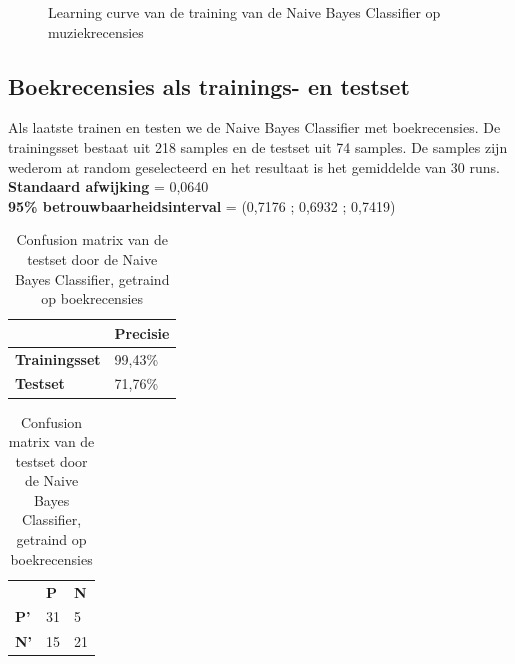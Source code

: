 \begin{appendices}
\begin{figure}[h]%
    \centering
    \label{fig:lc-music-music}
    \caption{Learning curve van de training van de Naive Bayes Classifier op muziekrecensies}
\end{figure}

\subsection{Boekrecensies als trainings- en testset}\label{Boeken als trainings- en testset}

Als laatste trainen en testen we de Naive Bayes Classifier met boekrecensies. De trainingsset bestaat uit 218 samples en de testset uit 74 samples. De samples zijn wederom at random geselecteerd en het resultaat is het gemiddelde van 30 runs.\\

\textbf{Standaard afwijking} = 0,0640\\
\textbf{95\% betrouwbaarheidsinterval} = (0,7176 ; 0,6932 ; 0,7419)\\
 
\begin{table}[h]
\centering
\setlength\tabcolsep{4pt}
\begin{minipage}[t]{0.48\textwidth}
\centering
\begin{tabular}{l|l|}
\cline{2-2}
                                            & \textbf{Precisie} \\ \hline
\multicolumn{1}{|l|}{\textbf{Trainingsset}} & 99,43\%           \\ \hline
\multicolumn{1}{|l|}{\textbf{Testset}}      & 71,76\%           \\ \hline
\end{tabular}
\caption{Classificatieprecisie Naive Bayes Classifier, getraind op boekrecensies}
\end{minipage}%
\hfill
\begin{minipage}[t]{0.48\textwidth}
\centering
\begin{tabular}{lll}
                                 & \textbf{P}               & \textbf{N}            \\ \cline{2-3} 
\multicolumn{1}{l|}{\textbf{P'}} & \multicolumn{1}{l|}{31} & \multicolumn{1}{l|}{5} \\ \cline{2-3} 
\multicolumn{1}{l|}{\textbf{N'}} & \multicolumn{1}{l|}{15} & \multicolumn{1}{l|}{21} \\ \cline{2-3} 
\end{tabular}
\caption{Confusion matrix van de testset door de  Naive Bayes Classifier, getraind op boekrecensies} 
\end{minipage}
\end{table}



\end{appendices}
